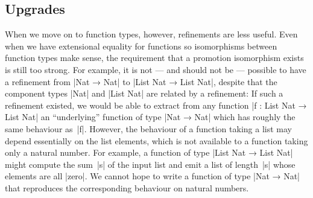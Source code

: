 

\subsection{Upgrades}

When we move on to function types, however, refinements are less useful.
Even when we have extensional equality for functions so isomorphisms between function types make sense, the requirement that a promotion isomorphism exists is still too strong.
For example, it is not --- and should not be --- possible to have a refinement from |Nat → Nat| to |List Nat → List Nat|, despite that the component types |Nat| and |List Nat| are related by a refinement:
If such a refinement existed, we would be able to extract from any function |f : List Nat → List Nat| an ``underlying'' function of type |Nat → Nat| which has roughly the same behaviour as~|f|.
However, the behaviour of a function taking a list may depend essentially on the list elements, which is not available to a function taking only a natural number.
For example, a function of type |List Nat → List Nat| might compute the sum~|s| of the input list and emit a list of length~|s| whose elements are all |zero|.
We cannot hope to write a function of type |Nat → Nat| that reproduces the corresponding behaviour on natural numbers.


